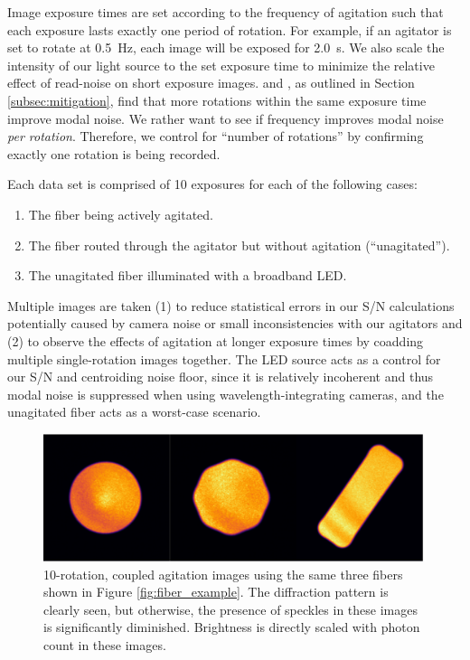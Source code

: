 Image exposure times are set according to the frequency of agitation such that each exposure lasts exactly one period of rotation. For example, if an agitator is set to rotate at \SI{0.5}{\hertz}, each image will be exposed for \SI{2.0}{\second}. We also scale the intensity of our light source to the set exposure time to minimize the relative effect of read-noise on short exposure images. \citet{baudrand_modal_2001} and \citet{lemke_modal_2011}, as outlined in Section \ref{subsec:mitigation}, find that more rotations within the same exposure time improve modal noise. We rather want to see if frequency improves modal noise \textit{per rotation}. Therefore, we control for ``number of rotations'' by confirming exactly one rotation is being recorded.

Each data set is comprised of 10 exposures for each of the following cases:
\begin{enumerate}
\item The fiber being actively agitated.
\item The fiber routed through the agitator but without agitation (``unagitated'').
\item The unagitated fiber illuminated with a broadband LED.
\end{enumerate}
Multiple images are taken (1) to reduce statistical errors in our S/N calculations potentially caused by camera noise or small inconsistencies with our agitators and (2) to observe the effects of agitation at longer exposure times by coadding multiple single-rotation images together. The LED source acts as a control for our S/N and centroiding noise floor, since it is relatively incoherent and thus modal noise is suppressed when using wavelength-integrating cameras, and the unagitated fiber acts as a worst-case scenario.

\begin{figure}
\centering
	\includegraphics[width=\columnwidth]{figures-2/fiber_improved.pdf}
	\caption{10-rotation, coupled agitation images using the same three fibers shown in Figure \ref{fig:fiber_example}.  The diffraction pattern is clearly seen, but otherwise, the presence of speckles in these images is significantly diminished. Brightness is directly scaled with photon count in these images.}
\label{fig:fiber_improved}
\end{figure}

